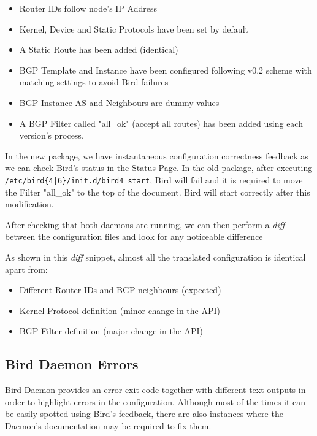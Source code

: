 \begin{itemize}
    \item Router IDs follow node's IP Address
    \item Kernel, Device and Static Protocols have been set by default
    \item A Static Route has been added  (identical)
    \item BGP Template and Instance have been configured following v0.2 scheme with matching settings to avoid Bird failures
    \item BGP Instance AS and Neighbours are dummy values
    \item A BGP Filter called "all\_ok" (accept all routes) has been added using each version's process.
\end{itemize}

In the new package, we have instantaneous configuration correctness feedback as we can check Bird's status in the Status Page. 
In the old package, after executing \texttt{/etc/bird\{4|6\}/init.d/bird4 start}, Bird will fail and it is required to move the Filter "all\_ok" to the top of the document. Bird will start correctly after this modification.

After checking that both daemons are running, we can then perform a \textit{diff} between the configuration files and look for any noticeable difference



As shown in this \textit{diff} snippet, almost all the translated configuration is identical apart from:

\begin{itemize}
\item Different Router IDs and BGP neighbours (expected)
\item Kernel Protocol definition (minor change in the API)
\item BGP Filter definition (major change in the API)
\end{itemize}

\subsection{Bird Daemon Errors}
Bird Daemon provides an error exit code together with different text outputs in order to highlight errors in the configuration. Although most of the times it can be easily spotted using Bird's feedback, there are also instances where the Daemon's documentation may be required to fix them.

